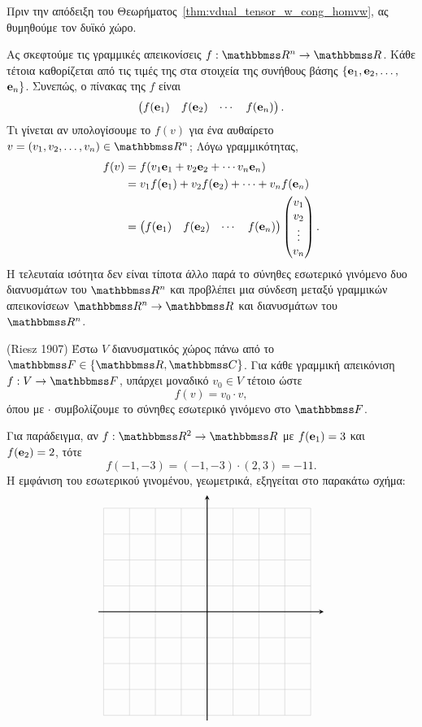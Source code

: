 \documentclass[12pt,a4paper,reqno]{amsart}
\begin{document}
Πριν την απόδειξη του Θεωρήματος~\ref{thm:vdual_tensor_w_cong_homvw}, ας θυμηθούμε τον δυϊκό χώρο.
\begin{digression_la}
Ας σκεφτούμε τις γραμμικές απεικονίσεις $f : \RR^n \to \RR$. Κάθε τέτοια καθορίζεται από τις τιμές της στα στοιχεία της συνήθους βάσης $\{\mathbf{e}_1, \mathbf{e}_2, \dots,$ $\mathbf{e}_n\}$. Συνεπώς, ο πίνακας της $f$ είναι 
\[
\begin{pmatrix}
    f(\mathbf{e}_1) & f(\mathbf{e}_2) & \cdots & f(\mathbf{e}_n)
\end{pmatrix}.
\]
Τι γίνεται αν υπολογίσουμε το $f(v)$ για ένα αυθαίρετο $v = (v_1, v_2, \dots, v_n) \in \RR^n$; Λόγω γραμμικότητας,
\begin{align*}
    f(v) 
    &= f(v_1\mathbf{e}_1 + v_2\mathbf{e}_2 + \cdots v_n\mathbf{e}_n) \\
    &= v_1f(\mathbf{e}_1) + v_2f(\mathbf{e}_2) + \cdots + v_nf(\mathbf{e}_n) \\ 
    &= \begin{pmatrix}
    f(\mathbf{e}_1) & f(\mathbf{e}_2) & \cdots & f(\mathbf{e}_n)
    \end{pmatrix}
    \begin{pmatrix}
        v_1 \\ 
        v_2 \\ 
        \vdots \\ 
        v_n
    \end{pmatrix}.
\end{align*}
Η τελευταία ισότητα δεν είναι τίποτα άλλο παρά το σύνηθες εσωτερικό γινόμενο δυο διανυσμάτων του $\RR^n$ και προβλέπει μια σύνδεση μεταξύ γραμμικών απεικονίσεων $\RR^n \to \RR$ και διανυσμάτων του $\RR^n$.
\begin{thm}{\rm(Riesz 1907)}
    Έστω $V$ διανυσματικός χώρος πάνω από το $\FF \in \{\RR, \CC\}$. Για κάθε γραμμική απεικόνιση $f: V \to \FF$, υπάρχει μοναδικό $v_0 \in V$ τέτοιο ώστε 
    \[
    f(v) = v_0 \cdot v,
    \]
    όπου με $\cdot$ συμβολίζουμε το σύνηθες εσωτερικό γινόμενο στο $\FF$.
\end{thm}

Για παράδειγμα, αν $f : \RR^2 \to \RR$ με $f(\mathbf{e}_1) = 3$ και $f(\mathbf{e}_2) = 2$, τότε 
\[
f(-1,-3) = (-1,-3)\cdot(2,3) = -11.
\]
Η εμφάνιση του εσωτερικού γινομένου, γεωμετρικά, εξηγείται στο παρακάτω σχήμα:
\[
\begin{tikzpicture}[scale=0.8,>=stealth]
\begin{scope}[shift={(0,0)}]
    \draw[step=1cm,gray!40,thin] (-4,-4) grid (4,4);

    \draw[thick,->] (-4.2,0) -- (4.5,0);
    \draw[thick,->] (0,-4.2) -- (0,4.5);


\end{scope}
\end{tikzpicture}\]
\end{digression_la}
\end{document}
